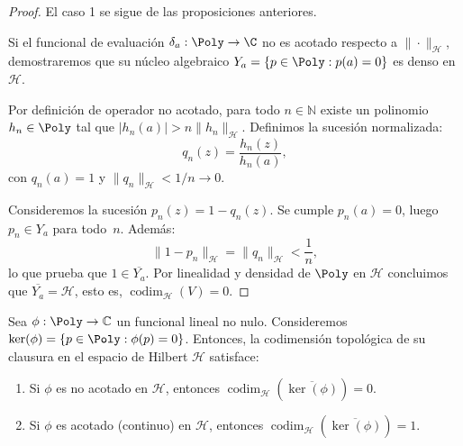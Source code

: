 \begin{proof}
	El caso 1 se sigue de las proposiciones anteriores.

	Si el funcional de evaluación $\delta_a: \Poly \to \C$ no es acotado respecto a $\|\cdot\|_{\mathcal{H}}$, demostraremos que su núcleo algebraico $Y_a = \{p \in \Poly : p(a)=0\}$ es denso en $\mathcal{H}$.

	Por definición de operador no acotado, para todo $n \in \mathbb{N}$ existe un polinomio $h_n \in \Poly$ tal que $|h_n(a)| > n \|h_n\|_{\mathcal{H}}$. Definimos la sucesión normalizada:
	$$ q_n(z) = \frac{h_n(z)}{h_n(a)}, $$
	con $q_n(a) = 1$ y $\|q_n\|_{\mathcal{H}} < 1/n \to 0$.

	Consideremos la sucesión $p_n(z) = 1 - q_n(z)$. Se cumple $p_n(a) = 0$, luego $p_n \in Y_a$ para todo~$n$. Además:
	$$ \|1 - p_n\|_{\mathcal{H}} = \|q_n\|_{\mathcal{H}} < \frac{1}{n}, $$
	lo que prueba que $1 \in \overline{Y_a}$. Por linealidad y densidad de $\Poly$ en $\mathcal{H}$ concluimos que $\overline{Y_a} = \mathcal{H}$, esto es, $\operatorname{codim}_{\mathcal{H}}(V) = 0$.
\end{proof}

\begin{thm}\label{thm:dicotomia_1}
	Sea $\phi : \Poly \to \mathbb{C}$ un funcional lineal no nulo. Consideremos $\ker(\phi) = \{ p \in \Poly : \phi(p) = 0 \}$. Entonces, la codimensión topológica de su clausura en el espacio de Hilbert $\mathcal{H}$ satisface:
	\begin{enumerate}
		\item Si $\phi$ es no acotado en $\mathcal{H}$, entonces $\operatorname{codim}_\mathcal{H}(\overline{\ker(\phi)}) = 0$.
		\item Si $\phi$ es acotado (continuo) en $\mathcal{H}$, entonces $\operatorname{codim}_\mathcal{H}(\overline{\ker(\phi)}) = 1$.
	\end{enumerate}
\end{thm}

